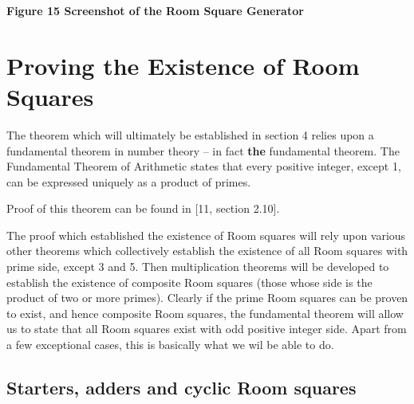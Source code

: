 \documentclass[
  12pt,
  a4paper]{book}
\begin{document}
\textbf{Figure 15 Screenshot of the Room Square Generator}

\hypertarget{proving-the-existence-of-room-squares}{%
\chapter{Proving the Existence of Room Squares}\label{proving-the-existence-of-room-squares}}

The theorem which will ultimately be established in section 4 relies
upon a fundamental theorem in number theory -- in fact \textbf{the}
fundamental theorem. The Fundamental Theorem of Arithmetic states that
every positive integer, except 1, can be expressed uniquely as a product
of primes.

Proof of this theorem can be found in {[}11, section 2.10{]}.

The proof which established the existence of Room squares will rely upon
various other theorems which collectively establish the existence of all
Room squares with prime side, except 3 and 5. Then multiplication
theorems will be developed to establish the existence of composite Room
squares (those whose side is the product of two or more primes). Clearly
if the prime Room squares can be proven to exist, and hence composite
Room squares, the fundamental theorem will allow us to state that all
Room squares exist with odd positive integer side. Apart from a few
exceptional cases, this is basically what we wil be able to do.

\hypertarget{starters-adders-and-cyclic-room-squares}{%
\section{Starters, adders and cyclic Room squares}\label{starters-adders-and-cyclic-room-squares}}
\end{document}
